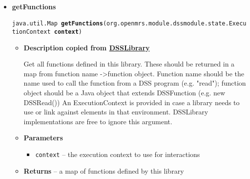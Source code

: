 {{{{{{{{\begin{itemize}
{\begin{itemize}
{Call this function. The arguments provided are as observed by the interpreter. Note that the actual number of arguments may not match the number of parameters expected; it is ultimately the function's responsibility to handle this situation.
}
\item{
{\bf  Parameters}
  \begin{itemize}
   \item{
\texttt{args} -- the arguments to the function}
  \end{itemize}
}%
\item{{\bf  Returns} -- 
the return value of the represented function 
}%
\end{itemize}
}%
\item{ 
\hypertarget{org.openmrs.module.dssmodule.intrinsics.DSSAlert.getFunctions(org.openmrs.module.dssmodule.state.ExecutionContext)}{{\bf  getFunctions}\\}
\texttt{ java.util.Map\ {\bf  getFunctions}(\texttt{org.openmrs.module.dssmodule.state.ExecutionContext} {\bf  context})
\label{org.openmrs.module.dssmodule.intrinsics.DSSAlert.getFunctions(org.openmrs.module.dssmodule.state.ExecutionContext)}}%
\begin{itemize}
\item{
{\bf  Description copied from \hyperlink{org.openmrs.module.dssmodule.intrinsics.DSSLibrary}{DSSLibrary}{\small {}} }

Get all functions defined in this library. These should be returned in a map from function name -\textgreater  function object. Function name should be the name used to call the function from a DSS program (e.g. "read"); function object should be a Java object that extends DSSFunction (e.g. new DSSRead()) An ExecutionContext is provided in case a library needs to use or link against elements in that environment. DSSLibrary implementations are free to ignore this argument.
}
\item{
{\bf  Parameters}
  \begin{itemize}
   \item{
\texttt{context} -- the execution context to use for interactions}
  \end{itemize}
}%
\item{{\bf  Returns} -- 
a map of functions defined by this library 
}%
\end{itemize}
}%
\end{itemize}
}
}}}}}}}
